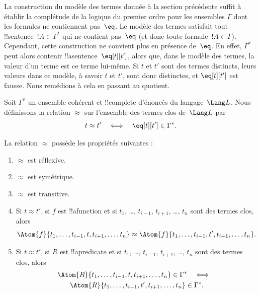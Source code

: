 \documentclass[../../../include/open-logic-section]{subfiles}
\begin{document}

\begin{explain}
La construction du modèle des termes donnée à la section précédente suffit
à établir la complétude de la logique du premier ordre pour les ensembles
$\Gamma$ dont les formules ne contiennent pas~$\eq$. Le modèle des termes
satisfait tout !!{sentence}~$!A\in\Gamma^*$ qui ne contient pas~$\eq$
(et donc toute formule~$!A\in\Gamma$). Cependant, cette construction ne
convient plus en présence de~$\eq$. En effet, $\Gamma^*$ peut alors
contenir !!a{sentence}~$\eq[t][t']$, alors que, dans le modèle des
termes, la valeur d'un terme est ce terme lui-même. Si $t$ et $t'$ sont des
termes distincts, leurs valeurs dans ce modèle, à savoir $t$ et $t'$, sont
donc distinctes, et $\eq[t][t']$ est fausse. Nous remédions à cela en
passant au quotient.
\end{explain}

\begin{defn}
  Soit $\Gamma^*$ un ensemble cohérent et !!{complete} d'énoncés du
  langage~$\Lang L$. Nous définissons la relation $\approx$ sur l'ensemble
  des termes clos de~$\Lang L$ par
  \[
  t\approx t' \quad\Longleftrightarrow\quad \eq[t][t']\in\Gamma^*.
  \]
\end{defn}

\begin{prop}
La relation $\approx$ possède les propriétés suivantes :
\begin{enumerate}
\item $\approx$ est réflexive.
\item $\approx$ est symétrique.
\item $\approx$ est transitive.
\item Si $t\approx t'$, si $f$ est !!a{function} et si $t_1$, \dots,
  $t_{i-1}$, $t_{i+1}$, \dots, $t_n$ sont des termes clos, alors
\[
\Atom{f}{t_1,\dots,t_{i-1},t,t_{i+1},\dots,t_n}\approx
\Atom{f}{t_1,\dots,t_{i-1},t',t_{i+1},\dots,t_n}.
\]
\item Si $t\approx t'$, si $R$ est !!a{predicate} et si $t_1$, \dots,
  $t_{i-1}$, $t_{i+1}$, \dots, $t_n$ sont des termes clos, alors
\begin{multline*}
\Atom{R}{t_1,\dots,t_{i-1},t,t_{i+1},\dots,t_n}\in\Gamma^*
\quad\Longleftrightarrow\quad\\
\Atom{R}{t_1,\dots,t_{i-1},t',t_{i+1},\dots,t_n}\in\Gamma^*.
\end{multline*}
\end{enumerate}
\end{prop}
\end{document}
